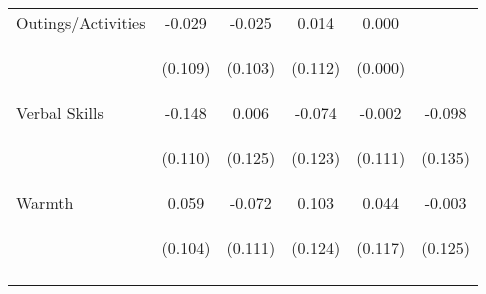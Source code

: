 \begin{tabular}{lccccc}
\noalign{\smallskip}Outings/Activities & -0.029 & -0.025 & 0.014 & 0.000 & \\
 & \begin{footnotesize}(0.109)\end{footnotesize} & \begin{footnotesize}(0.103)\end{footnotesize} & \begin{footnotesize}(0.112)\end{footnotesize} & \begin{footnotesize}(0.000)\end{footnotesize} & \begin{footnotesize}\end{footnotesize}\\
\noalign{\smallskip}Verbal Skills & -0.148 & 0.006 & -0.074 & -0.002 & -0.098\\
 & \begin{footnotesize}(0.110)\end{footnotesize} & \begin{footnotesize}(0.125)\end{footnotesize} & \begin{footnotesize}(0.123)\end{footnotesize} & \begin{footnotesize}(0.111)\end{footnotesize} & \begin{footnotesize}(0.135)\end{footnotesize}\\
\noalign{\smallskip}Warmth & 0.059 & -0.072 & 0.103 & 0.044 & -0.003\\
 & \begin{footnotesize}(0.104)\end{footnotesize} & \begin{footnotesize}(0.111)\end{footnotesize} & \begin{footnotesize}(0.124)\end{footnotesize} & \begin{footnotesize}(0.117)\end{footnotesize} & \begin{footnotesize}(0.125)\end{footnotesize}\\
\noalign{\smallskip}\hline\end{tabular}\\
